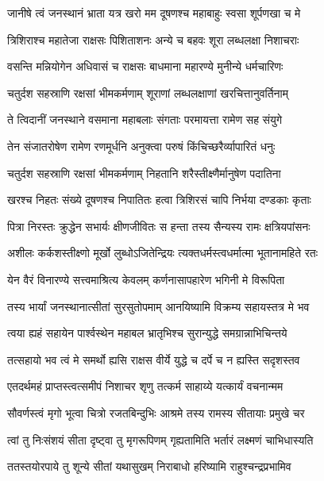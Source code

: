 \twolineshloka
{जानीषे त्वं जनस्थानं भ्राता यत्र खरो मम}
{दूषणश्च महाबाहुः स्वसा शूर्पणखा च मे} %

\twolineshloka
{त्रिशिराश्च महातेजा राक्षसः पिशिताशनः}
{अन्ये च बहवः शूरा लब्धलक्षा निशाचराः} %

\twolineshloka
{वसन्ति मन्नियोगेन अधिवासं च राक्षसः}
{बाधमाना महारण्ये मुनीन्ये धर्मचारिणः} %

\twolineshloka
{चतुर्दश सहस्राणि रक्षसां भीमकर्मणाम्}
{शूराणां लब्धलक्षाणां खरचित्तानुवर्तिनाम्} %

\twolineshloka
{ते त्विदानीं जनस्थाने वसमाना महाबलाः}
{संगताः परमायत्ता रामेण सह संयुगे} %

\twolineshloka
{तेन संजातरोषेण रामेण रणमूर्धनि}
{अनुक्त्वा परुषं किंचिच्छरैर्व्यापारितं धनुः} %

\twolineshloka
{चतुर्दश सहस्राणि रक्षसां भीमकर्मणाम्}
{निहतानि शरैस्तीक्ष्णैर्मानुषेण पदातिना} %

\twolineshloka
{खरश्च निहतः संख्ये दूषणश्च निपातितः}
{हत्वा त्रिशिरसं चापि निर्भया दण्डकाः कृताः} %

\twolineshloka
{पित्रा निरस्तः क्रुद्धेन सभार्यः क्षीणजीवितः}
{स हन्ता तस्य सैन्यस्य रामः क्षत्रियपांसनः} %

\twolineshloka
{अशीलः कर्कशस्तीक्ष्णो मूर्खो लुब्धोऽजितेन्द्रियः}
{त्यक्तधर्मस्त्वधर्मात्मा भूतानामहिते रतः} %

\twolineshloka
{येन वैरं विनारण्ये सत्त्वमाश्रित्य केवलम्}
{कर्णनासापहारेण भगिनी मे विरूपिता} %

\twolineshloka
{तस्य भार्यां जनस्थानात्सीतां सुरसुतोपमाम्}
{आनयिष्यामि विक्रम्य सहायस्तत्र मे भव} %

\twolineshloka
{त्वया ह्यहं सहायेन पार्श्वस्थेन महाबल}
{भ्रातृभिश्च सुरान्युद्धे समग्रान्नाभिचिन्तये} %

\twolineshloka
{तत्सहायो भव त्वं मे समर्थो ह्यसि राक्षस}
{वीर्ये युद्धे च दर्पे च न ह्यस्ति सदृशस्तव} %

\twolineshloka
{एतदर्थमहं प्राप्तस्त्वत्समीपं निशाचर}
{शृणु तत्कर्म साहाय्ये यत्कार्यं वचनान्मम} %

\twolineshloka
{सौवर्णस्त्वं मृगो भूत्वा चित्रो रजतबिन्दुभिः}
{आश्रमे तस्य रामस्य सीतायाः प्रमुखे चर} %

\twolineshloka
{त्वां तु निःसंशयं सीता दृष्ट्वा तु मृगरूपिणम्}
{गृह्यतामिति भर्तारं लक्ष्मणं चाभिधास्यति} %

\twolineshloka
{ततस्तयोरपाये तु शून्ये सीतां यथासुखम्}
{निराबाधो हरिष्यामि राहुश्चन्द्रप्रभामिव} %


